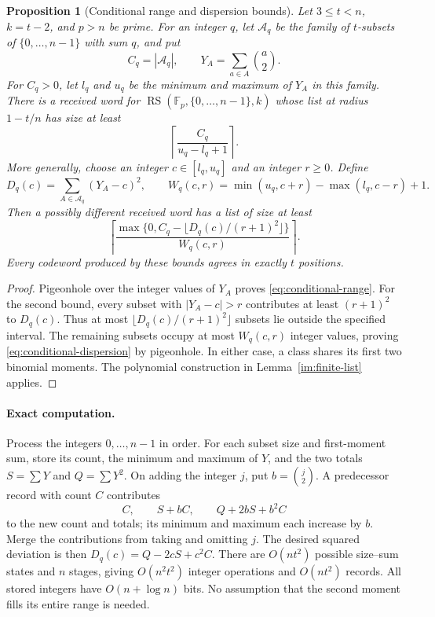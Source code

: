\documentclass[11pt,letterpaper]{article}
\newtheorem{proposition}[theorem]{Proposition}
\theoremstyle{definition}
\theoremstyle{remark}
\newcommand{\F}{\mathbb F}
\newcommand{\RS}{\operatorname{RS}}
\begin{document}
\begin{proposition}[Conditional range and dispersion bounds]
\label{prop:conditional-moments}
Let $3\le t<n$, $k=t-2$, and $p>n$ be prime. For an integer $q$,
let $\mathcal A_q$ be the family of $t$-subsets of
$\{0,\ldots,n-1\}$ with sum $q$, and put
\[
 C_q=|\mathcal A_q|,\qquad
 Y_A=\sum_{a\in A}\binom a2.
\]
For $C_q>0$, let $l_q$ and $u_q$ be the minimum and maximum of
$Y_A$ in this family. There is a received word for
$\RS(\F_p,\{0,\ldots,n-1\},k)$ whose list at radius $1-t/n$
has size at least
\begin{equation}\label{eq:conditional-range}
 \left\lceil\frac{C_q}{u_q-l_q+1}\right\rceil.
\end{equation}
More generally, choose an integer $c\in[l_q,u_q]$ and an integer
$r\ge0$. Define
\[
 D_q(c)=\sum_{A\in\mathcal A_q}(Y_A-c)^2,\qquad
 W_q(c,r)=\min(u_q,c+r)-\max(l_q,c-r)+1.
\]
Then a possibly different received word has a list of size at least
\begin{equation}\label{eq:conditional-dispersion}
 \left\lceil
 \frac{\max\{0,C_q-\lfloor D_q(c)/(r+1)^2\rfloor\}}
      {W_q(c,r)}\right\rceil.
\end{equation}
Every codeword produced by these bounds agrees in exactly $t$ positions.
\end{proposition}
\begin{proof}
Pigeonhole over the integer values of $Y_A$ proves
\eqref{eq:conditional-range}. For the second bound, every subset with
$|Y_A-c|>r$ contributes at least $(r+1)^2$ to $D_q(c)$. Thus at most
$\lfloor D_q(c)/(r+1)^2\rfloor$ subsets lie outside the specified
interval. The remaining subsets occupy at most $W_q(c,r)$ integer
values, proving \eqref{eq:conditional-dispersion} by pigeonhole.
In either case, a class shares its first two binomial moments.
The polynomial construction in Lemma~\ref{im:finite-list} applies.
\end{proof}

\paragraph{Exact computation.}
Process the integers $0,\ldots,n-1$ in order. For each subset size
and first-moment sum, store its count, the minimum and maximum of
$Y$, and the two totals $S=\sum Y$ and $Q=\sum Y^2$.
On adding the integer $j$, put $b=\binom j2$. A predecessor record
with count $C$ contributes
\[
 C,\qquad S+bC,\qquad Q+2bS+b^2C
\]
to the new count and totals; its minimum and maximum each increase
by $b$. Merge the contributions from taking and omitting $j$.
The desired squared deviation is then
$D_q(c)=Q-2cS+c^2C$.
There are $O(nt^2)$ possible size--sum states and $n$ stages,
giving $O(n^2t^2)$ integer operations and $O(nt^2)$ records.
All stored integers have $O(n+\log n)$ bits. No assumption that the
second moment fills its entire range is needed.
\end{document}
